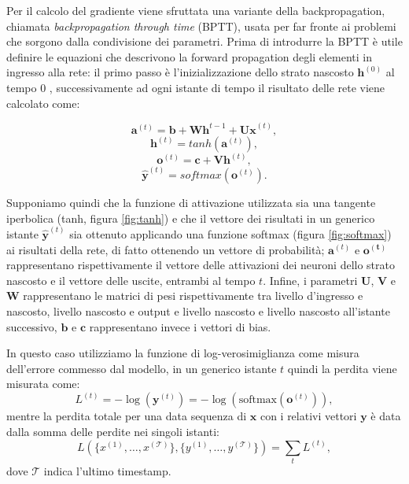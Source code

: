\documentclass[../../main.tex]{subfiles}
\begin{document}
Per il calcolo del gradiente viene sfruttata una variante della  backpropagation, chiamata \textit{backpropagation through time} (BPTT), usata per far fronte ai problemi che sorgono dalla condivisione dei parametri. Prima di introdurre la BPTT è utile definire le equazioni che descrivono la forward propagation degli elementi in ingresso alla rete: il primo passo è l'inizializzazione dello strato nascosto $\boldsymbol{h}^{(0)}$ al tempo 0 , successivamente ad ogni istante di tempo il risultato delle rete viene calcolato come:
\begin{fleqn}[1cm]
    \begin{equation}
        \boldsymbol{a}^{(t)} = \boldsymbol{b} + \boldsymbol{W h}^{t-1} + \boldsymbol{U x}^{(t)},
    \end{equation}
    \begin{equation}
        \boldsymbol{h}^{(t)} = tanh(\boldsymbol{a}^{(t)}),
    \end{equation}
    \begin{equation}
        \boldsymbol{o}^{(t)} = \boldsymbol{c} + \boldsymbol{V h}^{(t)},
    \end{equation}
    \begin{equation}
        \boldsymbol{\hat{y}}^{(t)} = softmax(\boldsymbol{o}^{(t)}).
    \end{equation}
\end{fleqn}
Supponiamo quindi che la funzione di attivazione utilizzata sia una tangente iperbolica (tanh, figura \ref{fig:tanh}) e che il vettore dei risultati in un generico istante $\boldsymbol{\hat{y}}^{(t)}$ sia ottenuto applicando una funzione softmax (figura \ref{fig:softmax}) ai risultati della rete, di fatto ottenendo un vettore di probabilità; $\boldsymbol{a}^{(t)}$ e $\boldsymbol{o^{(t)}}$ rappresentano rispettivamente il vettore delle attivazioni dei neuroni dello strato nascosto e il vettore delle uscite, entrambi al tempo $t$. Infine, i parametri $\boldsymbol{U}$, $\boldsymbol{V}$ e $\boldsymbol{W}$ rappresentano le matrici di pesi rispettivamente tra livello d'ingresso e nascosto, livello nascosto e output e livello nascosto e livello nascosto all'istante successivo, $\boldsymbol{b}$ e $\boldsymbol{c}$ rappresentano invece i vettori di bias.

In questo caso utilizziamo la funzione di log-verosimiglianza come misura dell'errore commesso dal modello, in un generico istante $t$ quindi la perdita viene misurata come:
\[L^{(t)} = -\log(\boldsymbol{y}^{(t)}) = -\log(\mathrm{softmax}(\boldsymbol{o}^{(t)})),\]
mentre la perdita totale per una data sequenza di $\boldsymbol{x}$ con i relativi vettori $\boldsymbol{y}$ è data dalla somma delle perdite nei singoli istanti:
\[L(\{x^{(1)}, \dots, x^{(\mathcal{T})}\}, \{y^{(1)}, \dots, y^{(\mathcal{T})}\}) = \sum_t L^{(t)},\]
dove $\mathcal{T}$ indica l'ultimo timestamp.
\end{document}
